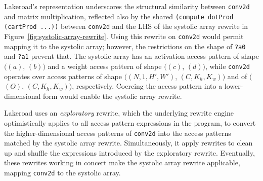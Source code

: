 \documentclass[prologue, dvipsnames, sigplan, screen, review, anonymous]{acmart}
\newcommand{\g}{Lakeroad\xspace}
\newcommand{\accesspatternshape}[2]{$($$\left( #1 \right)$, $\left( #2 \right)$$)$}
\newcommand{\ctd}{\texttt{conv2d}\xspace}
\newcommand{\tcd}[1]{\texttt{#1}}
\begin{document}
\g's representation underscores
  the structural similarity
  between \ctd and matrix multiplication,
  reflected also by the shared
  \tcd{(compute dotProd (cartProd ...))}
  between \ctd 
  and the LHS of the systolic array rewrite
  in Figure~\ref{fig:systolic-array-rewrite}.
Using this rewrite 
  on \ctd would permit mapping it to the systolic array; 
  however, 
  the restrictions
  on the shape of
  \texttt{?a0}
  and \texttt{?a1}
  prevent that.
The systolic array has 
  an activation access pattern
  of shape \accesspatternshape
  {a}{b}
  and a weight access pattern
  of shape \accesspatternshape
  {c}{d},
  while \ctd operates over
  access patterns
  of shape \accesspatternshape
  {N, 1,H',W'}{C, K_h, K_w}
  and
  of \accesspatternshape
  {O}{C, K_h, K_w},
  respectively.
Coercing the access pattern
  into a lower-dimensional form
  would enable the systolic array rewrite.
  
\g uses
  an \textit{exploratory} rewrite,
  which the underlying rewrite engine
  optimistically applies
  to all access pattern expressions in the program,
  to convert the higher-dimensional access patterns
  of \ctd
  into the access patterns
  matched by the systolic array rewrite.
Simultaneously, it apply rewrites to
  clean up and shuffle
  the expressions introduced by the exploratory rewrite.
Eventually,
  these rewrites working in concert
  make the systolic array rewrite
  applicable,
  mapping \ctd
  to the systolic array.
  
\end{document}
